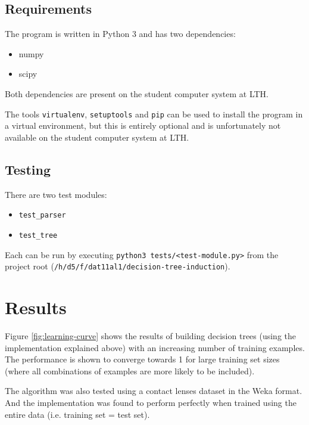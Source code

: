 \documentclass{article}
\begin{document}
\subsection{Requirements}
The program is written in Python 3 and has two dependencies:
\begin{itemize}
    \item numpy
    \item scipy
\end{itemize}
Both dependencies are present on the student computer system at LTH.

The tools \texttt{virtualenv}, \texttt{setuptools} and \texttt{pip} can be used to install the program in a virtual environment, but this is entirely optional and is unfortunately not available on the student computer system at LTH.

\subsection{Testing}
There are two test modules:
\begin{itemize}
    \item \texttt{test\_parser}
    \item \texttt{test\_tree}
\end{itemize}
Each can be run by executing \texttt{python3 tests/<test-module.py>} from the project root (\texttt{/h/d5/f/dat11al1/decision-tree-induction}).

\section{Results}

Figure \ref{fig:learning-curve} shows the results of building decision trees (using the implementation explained above) with an increasing number of training examples. The performance is shown to converge towards 1 for large training set sizes (where all combinations of examples are more likely to be included).

The algorithm was also tested using a contact lenses dataset in the Weka format. And the implementation was found to perform perfectly when trained using the entire data (i.e. training set = test set).
\end{document}
